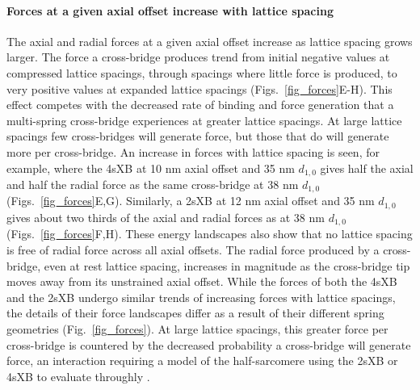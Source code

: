 \documentclass[]{article}
\begin{document}
\paragraph{Forces at a given axial offset increase with lattice spacing} %
The axial and radial forces at a given axial offset increase as lattice spacing grows larger.
The force a cross-bridge produces trend from initial negative values at compressed lattice spacings, through spacings where little force is produced, to very positive values at expanded lattice spacings (Figs.~\ref{fig_forces}E-H). 
This effect competes with the decreased rate of binding and force generation that a multi-spring cross-bridge experiences at greater lattice spacings. 
At large lattice spacings few cross-bridges will generate force, but those that do will generate more per cross-bridge. 
An increase in forces with lattice spacing is seen, for example, where the 4sXB at 10 nm axial offset and 35 nm $d_{1,0}$ gives half the axial and half the radial force as the same cross-bridge at 38 nm $d_{1,0}$ (Figs.~\ref{fig_forces}E,G). 
Similarly, a 2sXB at 12 nm axial offset and 35 nm $d_{1,0}$ gives about two thirds of the axial and radial forces as at 38 nm $d_{1,0}$ (Figs.~\ref{fig_forces}F,H).  
These energy landscapes also show that no lattice spacing is free of radial force across all axial offsets.  
The radial force produced by a cross-bridge, even at rest lattice spacing, increases in magnitude as the cross-bridge tip moves away from its unstrained axial offset. 
While the forces of both the 4sXB and the 2sXB undergo similar trends of increasing forces with lattice spacings, the details of their force landscapes differ as a result of their different spring geometries (Fig.~\ref{fig_forces}). 
At large lattice spacings, this greater force per cross-bridge is countered by the decreased probability a cross-bridge will generate force, an interaction requiring a model of the half-sarcomere using the 2sXB or 4sXB to evaluate throughly \citep{Martyn2004}. 
\end{document}
